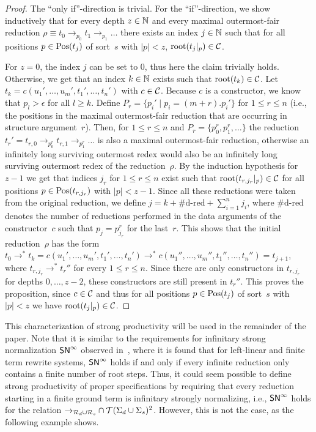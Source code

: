 \documentclass{eptcs}
\begin{document}
\begin{proof}
The ``only if''-direction is trivial. For the ``if''-direction, we show
inductively that for every depth $z \in \mathbb{N}$ and every maximal outermost-fair
reduction $\rho \equiv t_0 \to_{p_0} t_1 \to_{p_1} \dots$ there exists an index
$j \in \mathbb{N}$ such that for all positions $p \in \mathrm{Pos}(t_j)$ of sort~$s$ with
$|p| < z$, $\mathrm{root}(t_j|_p) \in \mathcal{C}$.

For $z = 0$, the index $j$ can be set to $0$, thus here the claim trivially
holds.
Otherwise, we get that an index $k \in \mathbb{N}$ exists such that
$\mathrm{root}(t_k) \in \mathcal{C}$. Let $t_k = c(u_1', \dotsc, u_m', t_1', \dotsc, t_n')$ with
$c \in \mathcal{C}$.
Because $c$ is a constructor, we know that $p_l > \epsilon$ for all $l \ge k$.
Define $P_r = \{ p_i' \mid p_i = (m{+}r) . p_i' \}$ for $1 \le r \le n$ (i.e.,
the positions in the maximal outermost-fair reduction that are occurring in
structure argument~$r$).
Then, for $1 \le r \le n$ and $P_r = \{ p_0^r, p_1^r, \dotsc \}$ the
reduction $t_r' = t_{r,0} \to_{p_0^r} t_{r,1} \to_{p_1^r} \dots$ is also a
maximal outermost-fair reduction, otherwise an infinitely long surviving
outermost redex would also be an infinitely long surviving outermost redex of
the reduction~$\rho$. By the induction hypothesis for $z-1$ we get
that indices $j_r$ for $1 \le r \le n$ exist such that
$\mathrm{root}(t_{r,j_r}|_p) \in \mathcal{C}$ for all positions $p \in \mathrm{Pos}(t_{r,j_r})$ with
$|p| < z-1$. Since all these reductions were taken from the original reduction,
we define $j = k + \#\text{d-red} + \sum_{i=1}^n j_i$,
where $\#\text{d-red}$ denotes the number of reductions performed in the
data arguments of the constructor~$c$ such that $p_j = p_{j_r}^r$ for the
last~$r$.
This shows that the initial reduction~$\rho$ has the form
$t_0 \to^* t_k = c(u_1', \dotsc, u_m', t_1', \dotsc, t_n') \to^*
c(u_1'', \dotsc, u_m'', t_1'', \dotsc, t_n'') = t_{j+1}$,
where $t_{r,j_r} \to^* t_r''$ for every $1 \le r \le n$. Since there are only
constructors in $t_{r,j_r}$ for depths $0, \dotsc, z-2$, these constructors are
still present in $t_r''$. This proves the proposition, since $c \in \mathcal{C}$ and
thus for all positions $p \in \mathrm{Pos}(t_j)$ of sort~$s$ with $|p| < z$ we have
$\mathrm{root}(t_j|_p) \in \mathcal{C}$.
\end{proof}


This characterization of strong productivity will be used in the remainder of
the paper. Note that it is similar to the requirements for infinitary strong
normalization $\mathsf{SN}^{\infty}$ observed in~\cite{Z08}, where it is found that for
left-linear and finite term rewrite systems, $\mathsf{SN}^{\infty}$ holds if and only if every
infinite reduction only contains a finite number of root steps. Thus, it could
seem possible to define strong productivity of proper specifications by
requiring that every reduction starting in a finite ground term is infinitary
strongly normalizing, i.e., $\mathsf{SN}^{\infty}$ holds for the relation
${\to_{\mathcal{R}_d \cup \mathcal{R}_s}} \cap \mathcal{T}(\Sigma_d \cup \Sigma_s)^2$.
However, this is not the case, as the following example shows.
\end{document}
